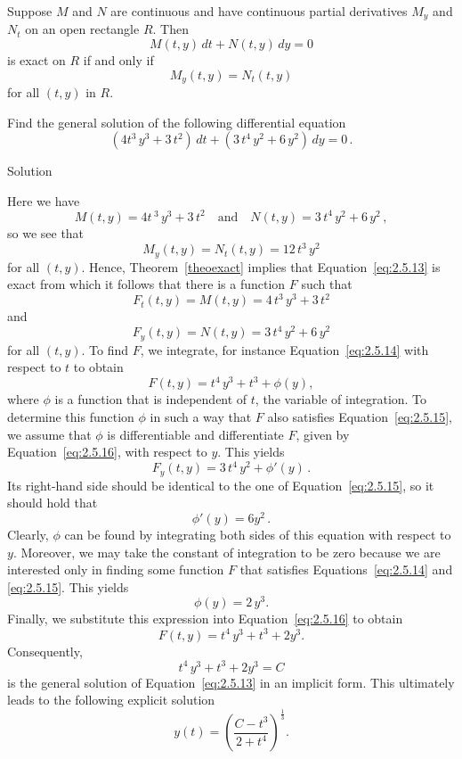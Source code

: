 \begin{theorem}
\label{theoexact}
Suppose  $M$ and $N$ are continuous and have continuous partial derivatives
$M_y$ and $N_t$ on an open rectangle $R.$ Then
$$
M(t,y)\,d t+N(t,y)\,d y=0
$$
is exact on $R$ if and only if
\begin{equation} \label{eq:2.5.12}
M_y(t,y)=N_t(t,y)
\end{equation}
for all $(t,y)$ in $R$.
\end{theorem}


\begin{example}\label{example:2.5.3} 
Find the general solution of the following differential equation
\begin{equation} \label{eq:2.5.13}
\left(4t^3\,y^3+3\,t^2\right)\,d t+\left(3\,t^4\,y^2+6\,y^2\right)\,d y=0\,.
\end{equation}

Solution 


Here we have
$$
M(t,y)=4t\,^3\,y^3+3\,t^2 \quad \text{and} \quad N(t,y)=3\,t^4\,y^2+6\,y^2\,,
$$
so we see that
$$
M_y(t,y)=N_t(t,y)=12\,t^3\,y^2
$$
for all $(t,y)$. Hence, Theorem~\ref{theoexact} implies that Equation~\eqref{eq:2.5.13} is exact from which it follows that there is a function $F$ such that
\begin{equation} \label{eq:2.5.14}
F_t(t,y)=M(t,y)=4\,t^3\,y^3+3\,t^2
\end{equation}
 and
\begin{equation} \label{eq:2.5.15}
F_y(t,y)=N(t,y)=3\,t^4\,y^2+6\,y^2
\end{equation}
 for all $(t,y)$.  To find $F$, we integrate, for instance Equation~\eqref{eq:2.5.14} with respect to $t$ to obtain
\begin{equation} \label{eq:2.5.16}
F(t,y)=t^4\,y^3+t^3+\phi(y),
\end{equation}
 where $\phi$ is a function that is independent of $t$, the variable of integration. To determine this function $\phi$ in such a way that
$F$ also satisfies Equation~\eqref{eq:2.5.15}, we assume that $\phi$ is differentiable and differentiate $F$, given by Equation~\eqref{eq:2.5.16}, with respect to $y$. This yields
$$
F_y(t,y)=3\,t^4\,y^2+\phi'(y)\,.
$$
Its right-hand side should be identical to the one of Equation~\eqref{eq:2.5.15}, so it should hold that
$$
\phi'(y)=6y^2\,.
$$
Clearly, $\phi$ can be found by integrating both sides of this equation with respect to $y$. Moreover, we may take the constant of integration to be zero because we are interested only in finding some function $F$ that satisfies Equations~\eqref{eq:2.5.14} and \eqref{eq:2.5.15}. This yields
$$
\phi (y)=2\,y^3.
$$
Finally, we substitute this expression into Equation~\eqref{eq:2.5.16} to obtain
\begin{equation} \label{eq:2.5.17}
F(t,y)=t^4\,y^3+t^3+2y^3.
\end{equation}
Consequently,
$$
t^4\,y^3+t^3+2y^3=C
$$
is the general solution of Equation~\eqref{eq:2.5.13} in an implicit form. This ultimately leads to the following explicit solution
$$
y(t)=\left(\dfrac{C-t^3}{2+t^4}\right)^{\frac{1}{3}}.
$$


\end{example}
